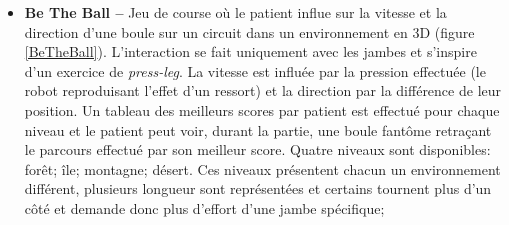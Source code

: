 \begin{itemize}
\begin{itemize}
			\begin{minipage}{\linewidth}
				\label{BikeRehab}
			\end{minipage}\medskip
						
			\item \textbf{Be The Ball --} Jeu de course où le patient influe sur la vitesse et la direction d'une boule sur un circuit dans un environnement en 3D (figure \ref{BeTheBall}). L'interaction se fait uniquement avec les jambes et s'inspire d'un exercice de \textit{press-leg}. La vitesse est influée par la pression effectuée (le robot reproduisant l'effet d'un ressort) et la direction par la différence de leur position. Un tableau des meilleurs scores par patient est effectué pour chaque niveau et le patient peut voir, durant la partie, une boule fantôme retraçant le parcours effectué par son meilleur score. Quatre niveaux sont disponibles: forêt; île; montagne; désert. Ces niveaux présentent chacun un environnement différent, plusieurs longueur sont représentées et certains tournent plus d'un côté et demande donc plus d'effort d'une jambe spécifique;\medskip
			
			\begin{minipage}{\linewidth}
				\label{BeTheBall}
			\end{minipage}\medskip
			

\end{itemize}
\end{itemize}
